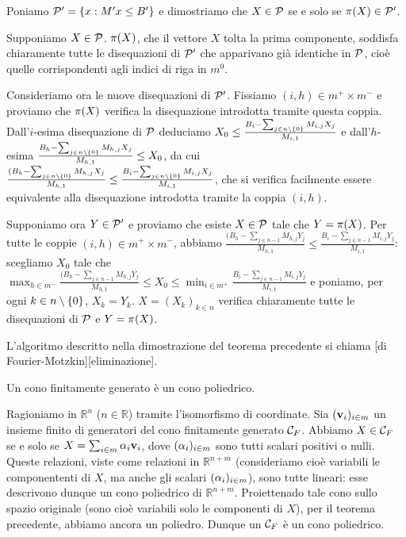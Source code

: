 \par Poniamo $\mathcal{P}' = \lbrace x: M' x \leq B' \rbrace$ e dimostriamo che $X \in \mathcal{P}$ se e solo se $\Projection(X) \in \Polyhedron'$.
\par Supponiamo $X \in \mathcal{P}$. $\Projection(X)$, che il vettore $X$ tolta la prima componente, soddisfa chiaramente tutte le disequazioni di $\mathcal{P}'$ che apparivano gi\`a identiche in $\mathcal{P}$, cio\`e quelle corrispondenti agli indici di riga in $m^0$.
\par Consideriamo ora le nuove disequazioni di $\mathcal{P}'$. Fissiamo $(i,h) \in m^+ \times m^-$ e proviamo che $\Projection(X)$ verifica la disequazione introdotta tramite questa coppia. Dall'$i$-esima disequazione di $\mathcal{P}$ deduciamo $X_0 \leq \frac{B_i - \sum_{j \in n \setminus \lbrace 0 \rbrace} M_{i,j}X_j}{M_{i,1}}$ e dall'$h$-esima $\frac{B_h - \sum_{j \in n \setminus \lbrace 0 \rbrace} M_{h,j}X_j}{M_{h,1}} \leq X_0$, da cui $\frac{(B_h - \sum_{j \in n \setminus \lbrace 0 \rbrace} M_{h,j}X_j}{M_{h,1}} \leq \frac{B_i - \sum_{j \in n \setminus \lbrace 0 \rbrace} M_{i,j}X_j}{M_{i,1}}$, che si verifica facilmente essere equivalente alla disequazione introdotta tramite la coppia $(i,h)$.
\par Supponiamo ora $Y \in \mathcal{P}'$ e proviamo che esiste $X \in \mathcal{P}$ tale che $Y = \Projection(X)$. Per tutte le coppie $(i,h) \in m^+ \times m^-$, abbiamo $\frac{(B_h - \sum_{j \in n - 1} M_{h,j}Y_j}{M_{h,1}} \leq \frac{B_i - \sum_{j \in n - 1} M_{i,j}Y_j}{M_{i,1}}$: scegliamo $X_0$ tale che $\max_{h \in m^-} \frac{(B_h - \sum_{j \in n - 1} M_{h,j}Y_j}{M_{h,1}} \leq X_0 \leq \min_{i \in m^+} \frac{B_i - \sum_{j \in n - 1} M_{i,j}Y_j}{M_{i,1}}$ e poniamo, per ogni $k \in n \setminus \lbrace 0 \rbrace$, $X_k = Y_k$. $X = (X_k)_{k \in n}$ verifica chiaramente tutte le disequazioni di $\mathcal{P}$ e $Y = \Projection(X)$. \EndProof
\begin{Definition}
	L'algoritmo descritto nella dimostrazione del teorema precedente si chiama [di Fourier-Motzkin][eliminazione].
\end{Definition}
\begin{Corollary}
	Un cono finitamente generato \`e un cono poliedrico.
\end{Corollary}
\Proof Ragioniamo in $\mathbb{R}^n$ ($n \in \mathbb{R}$) tramite l'isomorfismo di coordinate. Sia $(\mathbf{v}_i)_{i \in m}$ un insieme finito di generatori del cono finitamente generato ${\mathcal{C}_F}$. Abbiamo $X \in {\mathcal{C}_F}$ se e solo se $X = \sum_{i \in m} \alpha_i \mathbf{v}_i$, dove $(\alpha_i)_{i \in m}$ sono tutti scalari positivi o nulli. Queste relazioni, viste come relazioni in $\mathbb{R}^{n + m}$ (consideriamo cio\`e variabili le componententi di $X$, ma anche gli scalari $(\alpha_i)_{i \in m}$), sono tutte lineari: esse descrivono dunque un cono poliedrico di $\mathbb{R}^{n + m}$. Proiettenado tale cono sullo spazio originale (sono cio\`e variabili solo le componenti di $X$), per il teorema precedente, abbiamo ancora un poliedro. Dunque un ${\mathcal{C}_F}$ \`e un cono poliedrico. \EndProof
